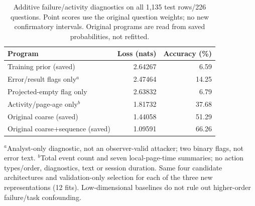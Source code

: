 \begin{table}[t]
\centering\footnotesize
\caption{Additive failure/activity diagnostics on all 1,135 test rows/226 questions. Point scores use the original question weights; no new confirmatory intervals. Original programs are read from saved probabilities, not refitted.}
\label{tab:h2-failure-diagnostics}
\begin{tabularx}{\columnwidth}{@{}Yrr@{}}
\toprule
Program & Loss (nats) & Accuracy (\%) \\
\midrule
Training prior (saved) & 2.64267 & 6.59 \\
Error/result flags only$^{a}$ & 2.47464 & 14.25 \\
Projected-empty flag only & 2.63832 & 6.79 \\
Activity/page-age only$^{b}$ & 1.81732 & 37.68 \\
Original coarse (saved) & 1.44058 & 51.29 \\
Original coarse+sequence (saved) & 1.09591 & 66.26 \\
\bottomrule
\end{tabularx}
\par\smallskip\raggedright\footnotesize
$^{a}$Analyst-only diagnostic, not an observer-valid attacker; two binary flags, not error text.
$^{b}$Total event count and seven local-page-time summaries; no action types/order, diagnostics, text or session duration. Same four candidate architectures and validation-only selection for each of the three new representations (12 fits). Low-dimensional baselines do not rule out higher-order failure/task confounding.
\end{table}
